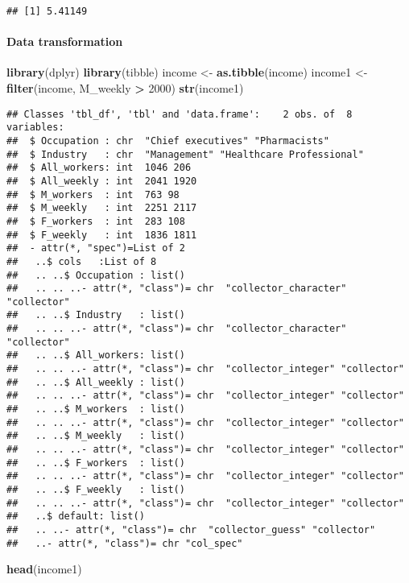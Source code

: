 \documentclass[]{article}
\newenvironment{Shaded}{\begin{snugshade}}{\end{snugshade}}
\newcommand{\KeywordTok}[1]{\textcolor[rgb]{0.13,0.29,0.53}{\textbf{#1}}}
\newcommand{\DecValTok}[1]{\textcolor[rgb]{0.00,0.00,0.81}{#1}}
\newcommand{\StringTok}[1]{\textcolor[rgb]{0.31,0.60,0.02}{#1}}
\newcommand{\OperatorTok}[1]{\textcolor[rgb]{0.81,0.36,0.00}{\textbf{#1}}}
\newcommand{\NormalTok}[1]{#1}
\let\oldparagraph\paragraph
\renewcommand{\paragraph}[1]{\oldparagraph{#1}\mbox{}}
\begin{document}
\begin{verbatim}
## [1] 5.41149
\end{verbatim}

\paragraph{Data transformation}\label{data-transformation}

\begin{Shaded}
\begin{Highlighting}[]
\KeywordTok{library}\NormalTok{(dplyr)}
\KeywordTok{library}\NormalTok{(tibble)}
\NormalTok{income <-}\StringTok{ }\KeywordTok{as.tibble}\NormalTok{(income)}
\NormalTok{income1 <-}\StringTok{ }\KeywordTok{filter}\NormalTok{(income, M_weekly }\OperatorTok{>}\StringTok{ }\DecValTok{2000}\NormalTok{)}
\KeywordTok{str}\NormalTok{(income1)}
\end{Highlighting}
\end{Shaded}

\begin{verbatim}
## Classes 'tbl_df', 'tbl' and 'data.frame':    2 obs. of  8 variables:
##  $ Occupation : chr  "Chief executives" "Pharmacists"
##  $ Industry   : chr  "Management" "Healthcare Professional"
##  $ All_workers: int  1046 206
##  $ All_weekly : int  2041 1920
##  $ M_workers  : int  763 98
##  $ M_weekly   : int  2251 2117
##  $ F_workers  : int  283 108
##  $ F_weekly   : int  1836 1811
##  - attr(*, "spec")=List of 2
##   ..$ cols   :List of 8
##   .. ..$ Occupation : list()
##   .. .. ..- attr(*, "class")= chr  "collector_character" "collector"
##   .. ..$ Industry   : list()
##   .. .. ..- attr(*, "class")= chr  "collector_character" "collector"
##   .. ..$ All_workers: list()
##   .. .. ..- attr(*, "class")= chr  "collector_integer" "collector"
##   .. ..$ All_weekly : list()
##   .. .. ..- attr(*, "class")= chr  "collector_integer" "collector"
##   .. ..$ M_workers  : list()
##   .. .. ..- attr(*, "class")= chr  "collector_integer" "collector"
##   .. ..$ M_weekly   : list()
##   .. .. ..- attr(*, "class")= chr  "collector_integer" "collector"
##   .. ..$ F_workers  : list()
##   .. .. ..- attr(*, "class")= chr  "collector_integer" "collector"
##   .. ..$ F_weekly   : list()
##   .. .. ..- attr(*, "class")= chr  "collector_integer" "collector"
##   ..$ default: list()
##   .. ..- attr(*, "class")= chr  "collector_guess" "collector"
##   ..- attr(*, "class")= chr "col_spec"
\end{verbatim}

\begin{Shaded}
\begin{Highlighting}[]
\KeywordTok{head}\NormalTok{(income1)}
\end{Highlighting}
\end{Shaded}
\end{document}
